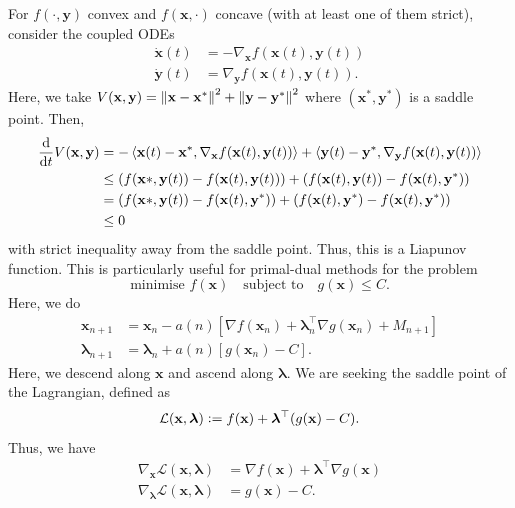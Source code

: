 For $f(\cdot, \mathbf{y})$ convex and $f(\mathbf{x},\cdot)$ concave (with at least one of them strict), consider the coupled ODEs
\begin{align*}
    \dot{\mathbf{x}}(t) &= -\nabla_{\mathbf{x}} f\left( \mathbf{x}(t), \mathbf{y}(t) \right) \\
    \dot{\mathbf{y}}(t) &= \nabla_{\mathbf{y}} f\left( \mathbf{x}(t), \mathbf{y}(t) \right).
\end{align*}
Here, we take $V(\mathbf{x}, \mathbf{y}) = \norm{\mathbf{x-x}^*}^2 + \norm{\mathbf{y-y}^*}^2$ where $(\mathbf{x}^*,\mathbf{y}^*)$ is a saddle point. Then, 
\begin{align*}
    \frac{\mathrm{d}}{\mathrm{d} t} V(\mathbf{x},\mathbf{y}) &= - \left\langle \mathbf{x}(t) - \mathbf{x}^*, \nabla_{\mathbf{x}} f(\mathbf{x}(t),\mathbf{y}(t)) \right\rangle + \left\langle \mathbf{y}(t) - \mathbf{y}^*, \nabla_{\mathbf{y}} f(\mathbf{x}(t),\mathbf{y}(t)) \right\rangle \\
    &\leq \left( f(\mathbf{x}*,\mathbf{y}(t)) - f(\mathbf{x}(t),\mathbf{y}(t)) \right) + \left( f(\mathbf{x}(t),\mathbf{y}(t)) - f(\mathbf{x}(t),\mathbf{y}^*) \right) \\
    &= \left( f(\mathbf{x}*,\mathbf{y}(t)) - f(\mathbf{x}(t),\mathbf{y}^*) \right) + \left( f(\mathbf{x}(t),\mathbf{y}^*) - f(\mathbf{x}(t),\mathbf{y}^*) \right) \\
    &\leq 0
\end{align*}
with strict inequality away from the saddle point. Thus, this is a Liapunov function. This is particularly useful for primal-dual methods for the problem 
\[
    \text{minimise } f(\mathbf{x}) \quad \text{subject to} \quad g(\mathbf{x}) \leq C.
\]
Here, we do
\begin{align*}
    \mathbf{x}_{n+1} &= \mathbf{x}_n - a(n) \left[ \nabla f(\mathbf{x}_n) + \bm{\lambda}_n^{\top} \nabla g(\mathbf{x}_n) + M_{n+1} \right] \\
    \bm{\lambda}_{n+1} &= \bm{\lambda}_n + a(n) \left[ g(\mathbf{x}_n) - C\right]. 
\end{align*}
Here, we descend along $\mathbf{x}$ and ascend along $\bm{\lambda}$. We are seeking the saddle point of the Lagrangian, defined as
\[
    \mathcal{L}(\mathbf{x},\bm{\lambda}) \vcentcolon= f(\mathbf{x}) + \bm{\lambda}^{\top} (g(\mathbf{x}) - C). 
\]
Thus, we have
\begin{align*}
    \nabla_{\mathbf{x}} \mathcal{L}(\mathbf{x}, \bm{\lambda}) &= \nabla f(\mathbf{x}) + \bm{\lambda}^{\top} \nabla g(\mathbf{x}) \\
    \nabla_{\bm{\lambda}} \mathcal{L}(\mathbf{x}, \bm{\lambda}) &= g(\mathbf{x}) - C. 
\end{align*}

